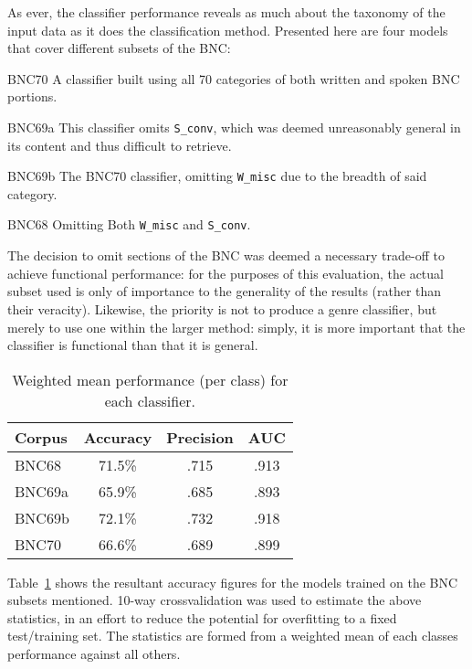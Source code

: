 As ever, the classifier performance reveals as much about the taxonomy of the input data as it does the classification method.  Presented here are four models that cover different subsets of the BNC:

\begin{itemizeTitle}
    \item[BNC70] A classifier built using all 70 categories of both written and spoken BNC portions.
    \item[BNC69a] This classifier omits \texttt{S\_conv}, which was deemed unreasonably general in its content and thus difficult to retrieve.
    \item[BNC69b] The BNC70 classifier, omitting \texttt{W\_misc} due to the breadth of said category.
    \item[BNC68] Omitting Both \texttt{W\_misc} and \texttt{S\_conv}.
\end{itemizeTitle}

The decision to omit sections of the BNC was deemed a necessary trade-off to achieve functional performance: for the purposes of this evaluation, the actual subset used is only of importance to the generality of the results (rather than their veracity).  Likewise, the priority is not to produce a genre classifier, but merely to use one within the larger method: simply, it is more important that the classifier is functional than that it is general.

\begin{table}[ht]
    \centering

    \begin{tabular}{ |l|c|c|c| }
        \hline 
        Corpus & Accuracy & Precision & AUC \\
        \hline
        BNC68  &  71.5\%  &  .715  &  .913 \\
        BNC69a &  65.9\%  &  .685  &  .893 \\
        BNC69b &  72.1\%  &  .732  &  .918 \\
        BNC70  &  66.6\%  &  .689  &  .899 \\
        \hline
    \end{tabular}
    \caption{Weighted mean performance (per class) for each classifier.}
    \label{table:evaluation:heuristics:classifieraccuracy}
\end{table}

Table~\ref{table:evaluation:heuristics:classifieraccuracy} shows the resultant accuracy figures for the models trained on the BNC subsets mentioned.  10-way crossvalidation was used to estimate the above statistics, in an effort to reduce the potential for overfitting to a fixed test/training set.  The statistics are formed from a weighted mean of each classes performance against all others.

